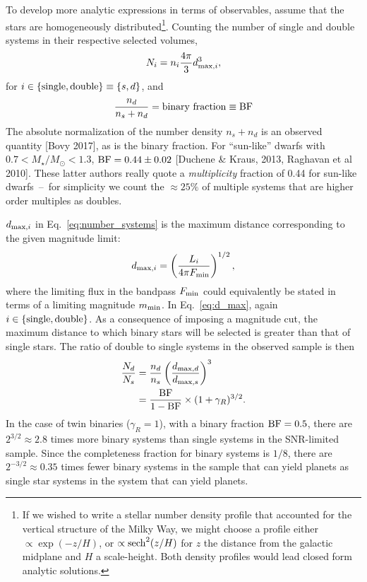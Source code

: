 \documentclass{emulateapj}
\begin{document}
To develop more analytic expressions in terms of observables, assume that the 
stars are homogeneously distributed\footnote{
If we wished to write a stellar number density profile that accounted for the 
vertical structure of the Milky Way, we might choose a profile either $\propto 
\exp(-z/H)$, or $\propto {\rm sech}^2(z/H)$ for $z$ the distance from the 
galactic midplane and $H$ a scale-height. Both density profiles would lead 
closed form analytic solutions.	}.
Counting the number of single and double systems in their respective selected 
volumes,
\begin{equation}
N_i = n_{i} \frac{4\pi}{3} d_{{\rm max},i}^3,
\label{eq:number_systems}
\end{equation}
for $i\in{\rm \{single,double\} } \equiv { \{s,d\} }$, and
\begin{equation}
\frac{n_{d}}{n_s+n_d} = {\rm binary\ fraction} \equiv {\rm BF}
\end{equation}
The absolute normalization of the number density $n_s + n_d$ is an observed
quantity [Bovy 2017], as is the binary fraction.
For ``sun-like'' dwarfs with $0.7<M_\star/M_\odot<1.3$,
${\rm BF}=0.44\pm0.02$ [Duchene \& Kraus, 2013, Raghavan et al 2010]. 
These latter authors really quote a {\it multiplicity} fraction of
0.44 for sun-like dwarfs~--~for simplicity we count the $\approx 25\%$ of 
multiple systems that are higher order multiples as doubles.

$d_{{\rm max},i}$ in Eq.~\ref{eq:number_systems} is the maximum distance 
corresponding to the given magnitude limit:
\begin{equation}
d_{{\rm max},i} = \left(\frac{L_{i}}{4 \pi F_{{\rm min}}}\right)^{1/2},
\label{eq:d_max}
\end{equation}
where the limiting flux in the bandpass $F_{{\rm min}}$ could equivalently be 
stated in terms of a limiting magnitude $m_{{\rm min}}$.
In Eq.~\ref{eq:d_max}, again $i\in{\rm \{single,double\} }$. As a 
consequence of imposing a magnitude cut, the maximum distance to which binary 
stars will be selected is greater than that of single stars.
The ratio of double to single systems in the observed sample is 
then
\begin{align}
\frac{N_d}{N_s} &= 
	\frac{n_d}{n_s}
	\left( \frac{d_{{\rm max}, d} }{d_{{\rm max}, s}} \right)^3 \\
&= \frac{{\rm BF}}{1 - {\rm BF}} \times (1+\gamma_R)^{3/2}.
\label{eq:beta_model1}
\end{align}
In the case of twin binaries ($\gamma_R = 1$), with a binary fraction 
${\rm BF} = 0.5$, there are 
$2^{3/2}\approx2.8$ times more binary systems than single systems in the 
SNR-limited sample.
Since the completeness fraction for binary systems is $1/8$, there are 
$2^{-3/2}\approx0.35$ times fewer binary systems in the sample that can yield 
planets as single star systems in the system that can yield planets.
\end{document}
